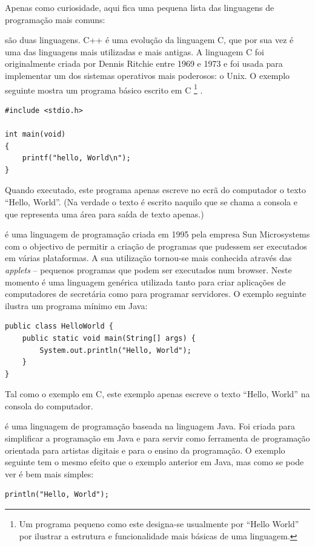 Apenas como curiosidade, aqui fica uma pequena lista das linguagens de programação mais comuns:
\begin{description} \itemsep5pt %

\item[C e C++] são duas linguagens. C++ é uma evolução da linguagem C, que por sua vez é uma das linguagens mais utilizadas e mais antigas. A linguagem C foi originalmente criada por Dennis Ritchie entre 1969 e 1973 e foi usada para implementar um dos sistemas operativos mais poderosos: o Unix. O exemplo seguinte mostra um programa básico escrito em C%
\footnote{
Um programa pequeno como este designa-se usualmente por ``Hello World'' por ilustrar a estrutura e funcionalidade mais básicas de uma linguagem.
}%
.
\begin{lstlisting}
#include <stdio.h>
 
int main(void)
{
    printf("hello, World\n");
}
\end{lstlisting}
Quando executado, este programa apenas escreve no ecrã do computador o texto ``Hello, World''. (Na verdade o texto é escrito naquilo que se chama a consola e que representa uma área para saída de texto apenas.)

\item[Java] é uma linguagem de programação criada em 1995 pela empresa Sun Microsystems com o objectivo de permitir a criação de programas que pudessem ser executados em várias plataformas. A sua utilização tornou-se mais conhecida através das \emph{applets} -- pequenos programas que podem ser executados num browser. Neste momento é uma linguagem genérica utilizada tanto para criar aplicações de computadores de secretária como para programar servidores.
O exemplo seguinte ilustra um programa mínimo em Java:
\begin{lstlisting}
public class HelloWorld {
	public static void main(String[] args) {
		System.out.println("Hello, World");
    }
}
\end{lstlisting}
Tal como o exemplo em C, este exemplo apenas escreve o texto ``Hello, World'' na consola do computador.

\item[Processing] é uma linguagem de programação baseada na linguagem Java. Foi criada para simplificar a programação em Java e para servir como ferramenta de programação orientada para artistas digitais e para o ensino da programação. O exemplo seguinte tem o mesmo efeito que o exemplo anterior em Java, mas como se pode ver é bem mais simples:
\begin{lstlisting}
println("Hello, World");
\end{lstlisting}


\end{description}
